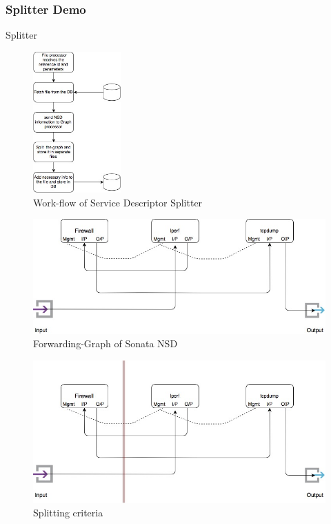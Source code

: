 \begin{frame}
\frametitle{Splitter Demo}
\Huge{\centerline{Splitter}}
\end{frame}


\begin{frame}	
\begin{figure} [!]
	\centering
	\includegraphics[width=0.3\textwidth]{images/img-1-split}
	\caption{Work-flow of Service Descriptor Splitter}
\end{figure}
\end{frame}

\begin{frame}
\begin{figure}
	\centering 
	\includegraphics[width=0.5\linewidth]{images/img-2-split}
	\caption{Forwarding-Graph of Sonata NSD}
\end{figure}

\begin{figure}
	\centering 
	\includegraphics[width=0.5\linewidth]{images/img-3-split}
	\caption{Splitting criteria}
\end{figure}
\end{frame}


